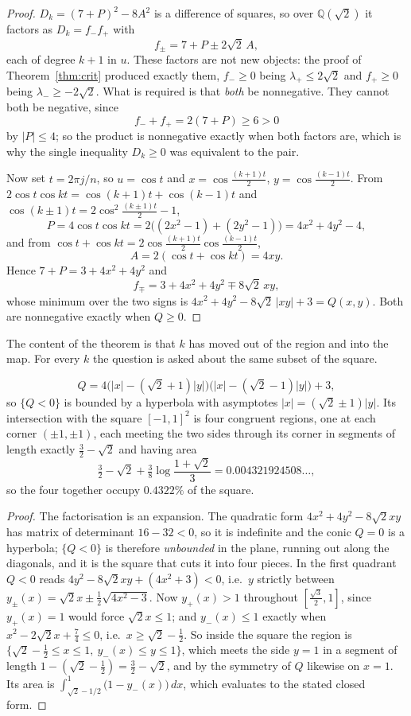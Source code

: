 \begin{proof}
$D_k=(7+P)^{2}-8A^{2}$ is a difference of squares, so over $\mathbb Q(\sqrt2)$
it factors as $D_k=f_-f_+$ with
\[
  f_\pm=7+P\pm2\sqrt2\,A ,
\]
each of degree $k+1$ in $u$. These factors are not new objects: the proof of
Theorem~\ref{thm:crit} produced exactly them, $f_-\ge0$ being
$\lambda_+\le2\sqrt2$ and $f_+\ge0$ being $\lambda_-\ge-2\sqrt2$. What is
required is that \emph{both} be nonnegative. They cannot both be negative,
since
\[
  f_-+f_+=2(7+P)\ge6>0
\]
by $|P|\le4$; so the product is nonnegative exactly when both factors are,
which is why the single inequality $D_k\ge0$ was equivalent to the pair.

Now set $t=2\pi j/n$, so $u=\cos t$ and $x=\cos\frac{(k+1)t}{2}$,
$y=\cos\frac{(k-1)t}{2}$. From $2\cos t\cos kt=\cos(k+1)t+\cos(k-1)t$ and
$\cos(k\pm1)t=2\cos^{2}\frac{(k\pm1)t}{2}-1$,
\[
  P=4\cos t\cos kt=2\bigl((2x^{2}-1)+(2y^{2}-1)\bigr)=4x^{2}+4y^{2}-4 ,
\]
and from $\cos t+\cos kt=2\cos\frac{(k+1)t}{2}\cos\frac{(k-1)t}{2}$,
\[
  A=2(\cos t+\cos kt)=4xy .
\]
Hence $7+P=3+4x^{2}+4y^{2}$ and
\[
  f_\mp=3+4x^{2}+4y^{2}\mp8\sqrt2\,xy ,
\]
whose minimum over the two signs is $4x^{2}+4y^{2}-8\sqrt2\,|xy|+3=Q(x,y)$.
Both are nonnegative exactly when $Q\ge0$.
\end{proof}

The content of the theorem is that $k$ has moved out of the region and into the
map. For every $k$ the question is asked about the same subset of the square.

\begin{corollary}\label{cor:lens}
\[
  Q=4\bigl(|x|-(\sqrt2+1)|y|\bigr)\bigl(|x|-(\sqrt2-1)|y|\bigr)+3 ,
\]
so $\{Q<0\}$ is bounded by a hyperbola with asymptotes
$|x|=(\sqrt2\pm1)|y|$. Its intersection with the square $[-1,1]^{2}$ is four
congruent regions, one at each corner $(\pm1,\pm1)$, each meeting the two
sides through its corner in segments of length exactly $\tfrac32-\sqrt2$ and
having area
\[
  \tfrac32-\sqrt2+\tfrac38\log\frac{1+\sqrt2}{3}=0.004321924508\ldots,
\]
so the four together occupy $0.4322\%$ of the square.
\end{corollary}

\begin{proof}
The factorisation is an expansion. The quadratic form $4x^{2}+4y^{2}-8\sqrt2xy$
has matrix of determinant $16-32<0$, so it is indefinite and the conic
$Q=0$ is a hyperbola; $\{Q<0\}$ is therefore \emph{unbounded} in the plane,
running out along the diagonals, and it is the square that cuts it into four
pieces. In the first quadrant $Q<0$ reads
$4y^{2}-8\sqrt2xy+(4x^{2}+3)<0$, i.e.\ $y$ strictly between
$y_\pm(x)=\sqrt2x\pm\tfrac12\sqrt{4x^{2}-3}$. Now $y_+(x)>1$ throughout
$[\tfrac{\sqrt3}{2},1]$, since $y_+(x)=1$ would force $\sqrt2x\le1$; and
$y_-(x)\le1$ exactly when $x^{2}-2\sqrt2x+\tfrac74\le0$, i.e.\ $x\ge\sqrt2-\tfrac12$.
So inside the square the region is
$\{\sqrt2-\tfrac12\le x\le1,\ y_-(x)\le y\le1\}$, which meets the side $y=1$
in a segment of length $1-(\sqrt2-\tfrac12)=\tfrac32-\sqrt2$, and by the
symmetry of $Q$ likewise on $x=1$. Its area is
$\int_{\sqrt2-1/2}^{1}\bigl(1-y_-(x)\bigr)\,dx$, which evaluates to the stated
closed form.
\end{proof}

